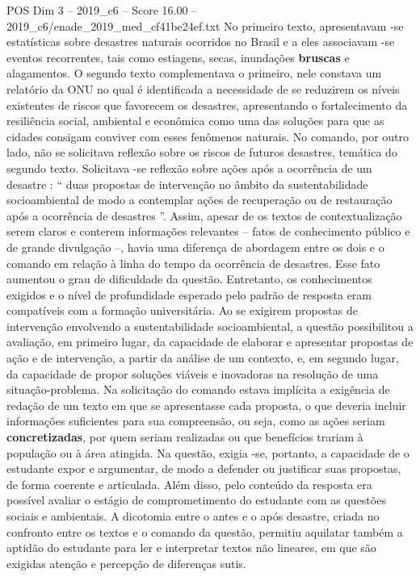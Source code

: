 \begin{textsample}{POS Dim 3 – 2019\_c6 – Score 16.00 – 2019\_c6/enade\_2019\_med\_cf41be24ef.txt}
No primeiro texto, apresentavam -se estatísticas sobre desastres naturais ocorridos no Brasil e a eles associavam -se eventos recorrentes, tais como estiagens, secas, inundações \textbf{bruscas} e alagamentos.
O segundo texto complementava o primeiro, nele constava um relatório da ONU no qual é identificada a necessidade de se reduzirem os níveis existentes de riscos que favorecem os desastres, apresentando o fortalecimento da resiliência social, ambiental e econômica como uma das soluções para que as cidades consigam conviver com esses fenômenos naturais.
No comando, por outro lado, não se solicitava reflexão sobre os riscos de futuros desastres, temática do segundo texto.
Solicitava -se reflexão sobre ações após a ocorrência de um desastre : “ duas propostas de intervenção no âmbito da sustentabilidade socioambiental de modo a contemplar ações de recuperação ou de restauração após a ocorrência de desastres ”.
Assim, apesar de os textos de contextualização serem claros e conterem informações relevantes – fatos de conhecimento público e de grande divulgação –, havia uma diferença de abordagem entre os dois e o comando em relação à linha do tempo da ocorrência de desastres.
Esse fato aumentou o grau de dificuldade da questão.
Entretanto, os conhecimentos exigidos e o nível de profundidade esperado pelo padrão de resposta eram compatíveis com a formação universitária.
Ao se exigirem propostas de intervenção envolvendo a sustentabilidade socioambiental, a questão possibilitou a avaliação, em primeiro lugar, da capacidade de elaborar e apresentar propostas de ação e de intervenção, a partir da análise de um contexto, e, em segundo lugar, da capacidade de propor soluções viáveis e inovadoras na resolução de uma situação-problema.
Na solicitação do comando estava implícita a exigência de redação de um texto em que se apresentasse cada proposta, o que deveria incluir informações suficientes para sua compreensão, ou seja, como as ações seriam \textbf{concretizadas}, por quem seriam realizadas ou que benefícios trariam à população ou à área atingida.
Na questão, exigia -se, portanto, a capacidade de o estudante expor e argumentar, de modo a defender ou justificar suas propostas, de forma coerente e articulada.
Além disso, pelo conteúdo da resposta era possível avaliar o estágio de comprometimento do estudante com as questões sociais e ambientais.
A dicotomia entre o antes e o após desastre, criada no confronto entre os textos e o comando da questão, permitiu aquilatar também a aptidão do estudante para ler e interpretar textos não lineares, em que são exigidas atenção e percepção de diferenças sutis.

\end{textsample}
